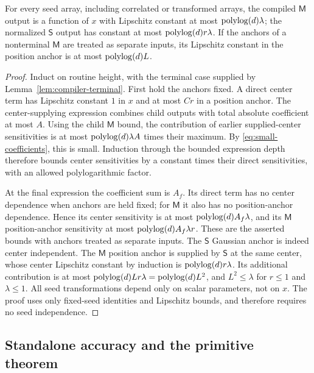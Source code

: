 \begin{lemma}
\label{lem:compiler-lipschitz}
For every seed array, including correlated or transformed arrays,
the compiled $\mathsf M$ output is a function of $x$ with Lipschitz
constant at most $\operatorname{polylog}(d)\lambda$; the normalized
$\mathsf S$ output has constant at most
$\operatorname{polylog}(d)r\lambda$.  If the anchors of a nonterminal
$\mathsf M$ are treated as separate inputs, its Lipschitz constant
in the position anchor is at most $\operatorname{polylog}(d)L$.
\end{lemma}
\begin{proof}
Induct on routine height, with the terminal case supplied by
Lemma~\ref{lem:compiler-terminal}.  First hold the anchors fixed.
A direct center term has Lipschitz constant $1$ in $x$ and at most
$Cr$ in a position anchor.  The center-supplying expression combines
child outputs with total absolute coefficient at most $A$.
Using the child $\mathsf M$ bound, the contribution of earlier
supplied-center sensitivities is at most
$\operatorname{polylog}(d)\lambda A$ times their maximum.  By
\eqref{eq:small-coefficients}, this is small.  Induction through
the bounded expression depth therefore bounds center sensitivities
by a constant times their direct sensitivities, with an allowed
polylogarithmic factor.

At the final expression the coefficient sum is $A_f$.  Its direct
term has no center dependence when anchors are held fixed; for
$\mathsf M$ it also has no position-anchor dependence.  Hence its
center sensitivity is at most
$\operatorname{polylog}(d)A_f\lambda$, and its $\mathsf M$ position-anchor
sensitivity at most $\operatorname{polylog}(d)A_f\lambda r$.
These are the asserted bounds with anchors treated as separate inputs.
The $\mathsf S$ Gaussian anchor is indeed center independent.
The $\mathsf M$ position anchor is supplied by $\mathsf S$ at
the same center, whose center Lipschitz constant by induction is
$\operatorname{polylog}(d)r\lambda$.  Its additional contribution is at most
$\operatorname{polylog}(d)Lr\lambda=\operatorname{polylog}(d)L^2$, and
$L^2\le\lambda$ for $r\le1$ and $\lambda\le1$.
All seed transformations depend only on scalar parameters, not on
$x$.  The proof uses only fixed-seed identities and Lipschitz
bounds, and therefore requires no seed independence.
\end{proof}

\subsection{Standalone accuracy and the primitive theorem}

